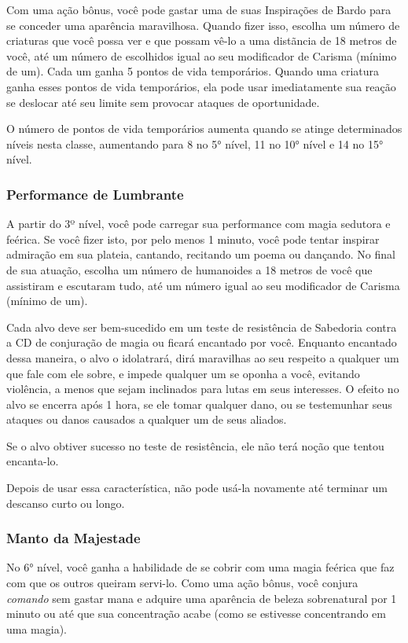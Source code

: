 \begin{multicols}{2}
Com uma ação bônus, você pode gastar uma de suas Inspirações de Bardo para se
conceder uma aparência maravilhosa. Quando fizer isso, escolha um número de
criaturas que você possa ver e que possam vê-lo a uma distãncia de 18 metros de
você, até um número de escolhidos igual ao seu modificador de Carisma (mínimo de
um). Cada um ganha 5 pontos de vida temporários. Quando uma criatura ganha
esses pontos de vida temporários, ela pode usar imediatamente sua reação se
deslocar até seu limite sem provocar ataques de oportunidade.

O número de pontos de vida temporários aumenta quando se atinge determinados
níveis nesta classe, aumentando para 8 no 5° nível, 11 no 10° nível e 14 no 15°
nível.

\subsubsection{Performance de Lumbrante}%

A partir do 3º nível, você pode carregar sua performance com magia sedutora e
feérica.
Se você fizer isto, por pelo menos 1 minuto, você pode tentar inspirar admiração
em sua plateia, cantando, recitando um poema ou dançando. No final de sua
atuação, escolha um número de humanoides a 18 metros de você que assistiram e
escutaram tudo, até um número igual ao seu modificador de Carisma (mínimo de
um).

Cada alvo deve ser bem-sucedido em um teste de resistência de Sabedoria contra
a CD de conjuração de magia ou ficará encantado por você. Enquanto encantado
dessa maneira, o alvo o idolatrará, dirá maravilhas ao seu respeito a qualquer
um que fale com ele sobre, e impede qualquer um se oponha a você, evitando
violência, a menos que sejam inclinados para lutas em seus interesses. O efeito
no alvo se encerra após 1 hora, se ele tomar qualquer dano, ou se testemunhar
seus ataques ou danos causados a qualquer um de seus aliados.

Se o alvo obtiver sucesso no teste de resistência, ele não terá noção que tentou
encanta-lo.

Depois de usar essa característica, não pode usá-la novamente até terminar um
descanso curto ou longo.

\subsubsection{Manto da Majestade}%

No 6° nível, você ganha a habilidade de se cobrir com uma magia feérica que faz
com que os outros queiram servi-lo. Como uma ação bônus, você conjura
\textit{comando} sem gastar mana e adquire uma aparência de beleza sobrenatural
por 1 minuto ou até que sua concentração acabe (como se estivesse concentrando
em uma magia).


\end{multicols}
